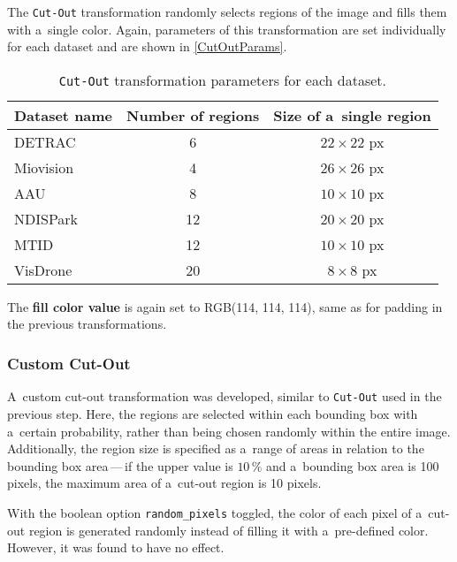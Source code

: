 The \texttt{Cut-Out} transformation randomly selects regions of the image and
fills them with a~single color. Again, parameters of this transformation are set
individually for each dataset and are shown in \autoref{CutOutParams}.

\begin{table}[h]
    \centering
    \begin{threeparttable}
        \begin{tabular}{|p{2.5cm}|c|c|}
            \hline
            Dataset name & Number of regions & Size of a~single region \\
            \hline
            DETRAC       &  6 & $22 \times 22$ px \\
            Miovision    &  4 & $26 \times 26$ px \\
            AAU          &  8 & $10 \times 10$ px \\
            NDISPark     & 12 & $20 \times 20$ px \\
            MTID         & 12 & $10 \times 10$ px \\
            VisDrone     & 20 & $8 \times 8$ px \\
            \hline
        \end{tabular}
        \caption{\texttt{Cut-Out} transformation parameters for each dataset.}
        \label{CutOutParams}
    \end{threeparttable}
\end{table}

The \textbf{fill color value} is again set to RGB(114, 114, 114), same as for
padding in the previous transformations.


\subsubsection*{Custom Cut-Out}

A~custom cut-out transformation was developed, similar to \texttt{Cut-Out} used
in the previous step. Here, the regions are selected within each bounding box
with a~certain probability, rather than being chosen randomly within the entire image.
Additionally, the region size is specified as a~range of areas in relation to the
bounding box area\,---\,if the upper value is $10\,\%$ and a~bounding box area is 100
pixels, the maximum area of a~cut-out region is 10 pixels.

With the boolean option \texttt{random\_pixels} toggled, the color of each pixel
of a~cut-out region is generated randomly instead of filling it with
a~pre-defined color. However, it was found to have no effect.

